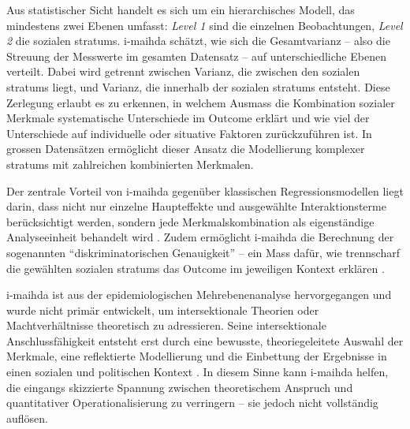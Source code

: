 
Aus statistischer Sicht handelt es sich um ein hierarchisches Modell, das mindestens zwei Ebenen umfasst: \textit{Level 1} sind die einzelnen Beobachtungen, \textit{Level 2} die sozialen \glspl{stratum}. \gls{i-maihda} schätzt, wie sich die Gesamtvarianz -- also die Streuung der Messwerte im gesamten Datensatz -- auf unterschiedliche Ebenen verteilt. Dabei wird getrennt zwischen Varianz, die zwischen den sozialen \glspl{stratum} liegt, und Varianz, die innerhalb der sozialen \glspl{stratum} entsteht. Diese Zerlegung erlaubt es zu erkennen, in welchem Ausmass die Kombination sozialer Merkmale systematische Unterschiede im Outcome erklärt und wie viel der Unterschiede auf individuelle oder situative Faktoren zurückzuführen ist. In grossen Datensätzen ermöglicht dieser Ansatz die Modellierung komplexer \glspl{stratum} mit zahlreichen kombinierten Merkmalen.

Der zentrale Vorteil von \gls{i-maihda} gegenüber klassischen Regressionsmodellen liegt darin, dass nicht nur einzelne Haupteffekte und ausgewählte Interaktionsterme berücksichtigt werden, sondern jede Merkmalskombination als eigenständige Analyseeinheit behandelt wird \parencite{scottIntersectionalityQuantitativeMethods2017,bowlegInvitedReflectionQuantifying2016}. Zudem ermöglicht \gls{i-maihda} die Berechnung der sogenannten \enquote{diskriminatorischen Genauigkeit} -- ein Mass dafür, wie trennscharf die gewählten sozialen \glspl{stratum} das Outcome im jeweiligen Kontext erklären \parencite{evansTutorialConductingIntersectional2024}.

\gls{i-maihda} ist aus der epidemiologischen Mehrebenenanalyse hervorgegangen und wurde nicht primär entwickelt, um intersektionale Theorien oder Machtverhältnisse theoretisch zu adressieren. Seine intersektionale Anschlussfähigkeit entsteht erst durch eine bewusste, theoriegeleitete Auswahl der Merkmale, eine reflektierte Modellierung und die Einbettung der Ergebnisse in einen sozialen und politischen Kontext \parencite{grossModellingIntersectionalityQuantitative2023}. In diesem Sinne kann \gls{i-maihda} helfen, die eingangs skizzierte Spannung zwischen theoretischem Anspruch und quantitativer Operationalisierung zu verringern -- sie jedoch nicht vollständig auflösen.

